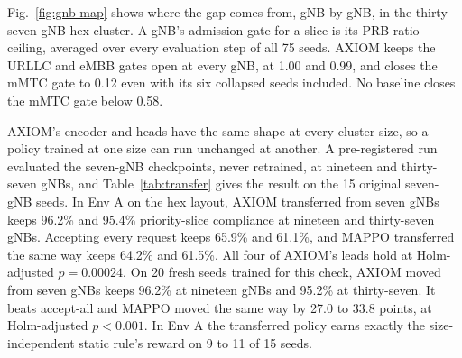 \documentclass[pdflatex,sn-basic,Numbered]{sn-jnl}
\begin{document}
Fig.~\ref{fig:gnb-map} shows where the gap comes from, gNB by gNB, in the thirty-seven-gNB hex cluster. A gNB's admission gate for a slice is its PRB-ratio ceiling, averaged over every evaluation step of all 75 seeds. AXIOM keeps the URLLC and eMBB gates open at every gNB, at 1.00 and 0.99, and closes the mMTC gate to 0.12 even with its six collapsed seeds included. No baseline closes the mMTC gate below 0.58.

AXIOM's encoder and heads have the same shape at every cluster size, so a policy trained at one size can run unchanged at another. A pre-registered run evaluated the seven-gNB checkpoints, never retrained, at nineteen and thirty-seven gNBs, and Table~\ref{tab:transfer} gives the result on the 15 original seven-gNB seeds. In Env A on the hex layout, AXIOM transferred from seven gNBs keeps 96.2\% and 95.4\% priority-slice compliance at nineteen and thirty-seven gNBs. Accepting every request keeps 65.9\% and 61.1\%, and MAPPO transferred the same way keeps 64.2\% and 61.5\%. All four of AXIOM's leads hold at Holm-adjusted $p=0.00024$. On 20 fresh seeds trained for this check, AXIOM moved from seven gNBs keeps 96.2\% at nineteen gNBs and 95.2\% at thirty-seven. It beats accept-all and MAPPO moved the same way by 27.0 to 33.8 points, at Holm-adjusted $p<0.001$. In Env A the transferred policy earns exactly the size-independent static rule's reward on 9 to 11 of 15 seeds.
\end{document}
